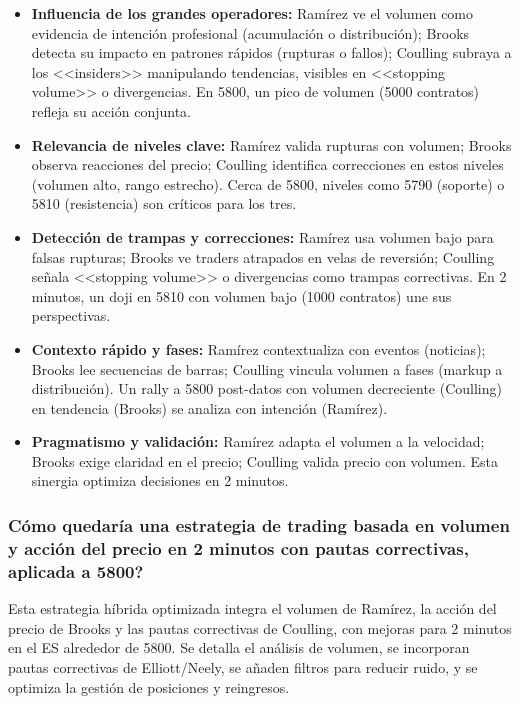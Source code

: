 \begin{itemize}
    \item \textbf{Influencia de los grandes operadores:} Ram\'irez ve el volumen como evidencia de intenci\'{o}n profesional (acumulaci\'{o}n o distribuci\'{o}n); Brooks detecta su impacto en patrones r\'{a}pidos (rupturas o fallos); Coulling subraya a los <<insiders>> manipulando tendencias, visibles en <<stopping volume>> o divergencias. En 5800, un pico de volumen (5000 contratos) refleja su acci\'{o}n conjunta.

    \item \textbf{Relevancia de niveles clave:} Ram\'irez valida rupturas con volumen; Brooks observa reacciones del precio; Coulling identifica correcciones en estos niveles (volumen alto, rango estrecho). Cerca de 5800, niveles como 5790 (soporte) o 5810 (resistencia) son cr\'iticos para los tres.

    \item \textbf{Detecci\'{o}n de trampas y correcciones:} Ram\'irez usa volumen bajo para falsas rupturas; Brooks ve traders atrapados en velas de reversi\'{o}n; Coulling se\~{n}ala <<stopping volume>> o divergencias como trampas correctivas. En 2 minutos, un doji en 5810 con volumen bajo (1000 contratos) une sus perspectivas.

    \item \textbf{Contexto r\'{a}pido y fases:} Ram\'irez contextualiza con eventos (noticias); Brooks lee secuencias de barras; Coulling vincula volumen a fases (markup a distribuci\'{o}n). Un rally a 5800 post-datos con volumen decreciente (Coulling) en tendencia (Brooks) se analiza con intenci\'{o}n (Ram\'irez).

    \item \textbf{Pragmatismo y validaci\'{o}n:} Ram\'irez adapta el volumen a la velocidad; Brooks exige claridad en el precio; Coulling valida precio con volumen. Esta sinergia optimiza decisiones en 2 minutos.
\end{itemize}

\subsubsection{\textquestiondown C\'{o}mo quedar\'{i}a una estrategia de trading basada en volumen y acci\'on del precio en 2 minutos con pautas correctivas, aplicada a 5800?}

Esta estrategia h\'{i}brida optimizada integra el volumen de Ram\'irez, la acci\'{o}n del precio de Brooks y las pautas correctivas de Coulling, con mejoras para 2 minutos en el ES alrededor de 5800. Se detalla el an\'alisis de volumen, se incorporan pautas correctivas de Elliott/Neely, se a\~{n}aden filtros para reducir ruido, y se optimiza la gesti\'on de posiciones y reingresos.

